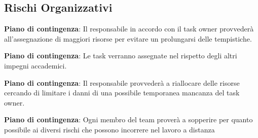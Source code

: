 	\subsection{Rischi Organizzativi}

		\def\productquality{
    			{
        			Calcolo
				Tempistiche e Costi
				RO1,
        			Causa RT1 le valutazioni sulle tempistiche e i costi economici potrebbero essere imprecisi, 
        			Vengono predisposte delle tabelle sulle tempistiche e sarà compito del responsabile monitorare l'andamento dello sviluppo,
        			Occorrenza: Alta 
				Pericolosità: Alta
    			},
		}
		
		\textbf{Piano di contingenza}: Il responsabile in accordo con il task owner provvederà all'assegnazione di maggiori risorse per evitare un prolungarsi delle tempistiche.
		\def\productquality{
			{
        			Impegni
				Accademici
				RO2,
        			Il periodo di sviluppo del progetto inizia a ridosso della sessione d'esami universitaria a cui tutti i membri del gruppo si vedono impegnati in diverse occasioni, 
        			In sede di riunione il team ha deciso di condividere i periodi di tempo in cui il loro contributo al progetto potrebbe calare o venir meno,
        			Occorrenza: Media 
				Pericolosità: Media
    			},
		}
		
		\textbf{Piano di contingenza}: Le task verranno assegnate nel rispetto degli altri impegni accademici.
		\pagebreak
		\def\productquality{
			{
        			Impegni
				Personali
				RO3,
        			è possibile il verificarsi di imprevisti personali che potrebbero influire nel corretto sviluppo del progetto, 
        			è compito di ogni membro del gruppo segnalare un eventuale imprevisto al responsabile del gruppo in modo da permettergli di riorganizzare l'agenda,
        			Occorrenza: Bassa 
				Pericolosità: Bassa
    			},
		}
		
		\textbf{Piano di contingenza}: Il responsabile provvederà a riallocare delle risorse cercando di limitare i danni di una possibile temporanea mancanza del task owner.
		
		\def\productquality{
			{
        			Rischi legati al lavoro a distanza
				RO4,
        			La pandemia covid ci impedisce il lavoro in presenza esponendoci ai rischi del lavoro a distanza, 
        			Malfunzionamenti hardware o instabilità della connessione ad internet non sono fattori di rischio controllabili o pronosticabili,
        			Occorrenza: Bassa 
				Pericolosità: Media
    			},
		}
		
		\textbf{Piano di contingenza}: Ogni membro del team proverà a sopperire per quanto possibile ai diversi rischi che possono incorrere nel lavoro a distanza



